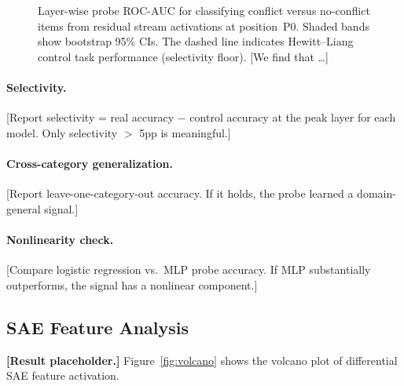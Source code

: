 \begin{figure}[t]
\centering
\caption{Layer-wise probe ROC-AUC for classifying conflict versus
  no-conflict items from residual stream activations at position~P0.
  Shaded bands show bootstrap 95\% CIs.  The dashed line indicates
  Hewitt--Liang control task performance (selectivity floor).  [We find
  that \ldots]}
\label{fig:probe_accuracy}
\end{figure}

\paragraph{Selectivity.}  [Report selectivity = real accuracy $-$ control
accuracy at the peak layer for each model.  Only selectivity $>$ 5pp is
meaningful.]

\paragraph{Cross-category generalization.}  [Report leave-one-category-out
accuracy.  If it holds, the probe learned a domain-general signal.]

\paragraph{Nonlinearity check.}  [Compare logistic regression vs.\ MLP probe
accuracy.  If MLP substantially outperforms, the signal has a nonlinear
component.]

\subsection{SAE Feature Analysis}
\label{sec:results_sae}

\textbf{[Result placeholder.]}  Figure~\ref{fig:volcano} shows the volcano
plot of differential SAE feature activation.

